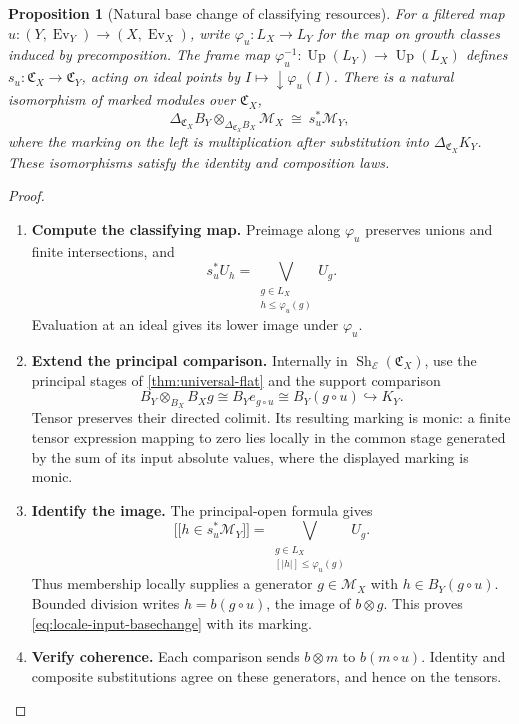 \documentclass[11pt,a4paper]{article}
\numberwithin{algorithm}{section}
\numberwithin{equation}{section}
\newtheorem{proposition}[proposition]{Proposition}
\theoremstyle{definition}
\theoremstyle{remark}
\theoremstyle{plain}
\newcommand{\E}{\mathcal E}
\newcommand{\incl}{\hookrightarrow}
\newcommand{\llbracket}{\mathopen{[\![}}
\newcommand{\rrbracket}{\mathclose{]\!]}}
\newcommand{\Ev}{{\operatorname{Ev}}}
\newcommand{\Up}{\operatorname{Up}}
\newcommand{\Sh}{\operatorname{Sh}}
\theoremstyle{definition}
\theoremstyle{plain}
\begin{document}
\begin{proposition}[Natural base change of classifying resources]
\label{prop:locale-input-change}
For a filtered map
$u:(Y,\Ev_Y)\to(X,\Ev_X)$, write
$\varphi_u:L_X\to L_Y$ for the map on growth classes induced by precomposition.
The frame map $\varphi_u^{-1}:\Up(L_Y)\to\Up(L_X)$ defines
$s_u:\mathfrak C_X\to\mathfrak C_Y$, acting on ideal points by
$I\mapsto\downarrow\varphi_u(I)$.  There is a natural
isomorphism of marked modules over $\mathfrak C_X$,
\begin{equation}\label{eq:locale-input-basechange}
 \Delta_{\mathfrak C_X}B_Y
 \otimes_{\Delta_{\mathfrak C_X}B_X}\mathscr M_X
 \ \cong\ s_u^*\mathscr M_Y,
\end{equation}
where the marking on the left is multiplication after
substitution into $\Delta_{\mathfrak C_X}K_Y$.
These isomorphisms satisfy the identity and composition laws.
\end{proposition}
\begin{proof}\leavevmode
\begin{enumerate}[leftmargin=*,align=left]
\item \textbf{Compute the classifying map.}
Preimage along $\varphi_u$ preserves unions and finite intersections,
and
\[
 s_u^*U_h=\bigvee_{\substack{g\in L_X\\h\le\varphi_u(g)}}U_g.
\]
Evaluation at an ideal gives its lower image under $\varphi_u$.

\item \textbf{Extend the principal comparison.}
Internally in $\Sh_\E(\mathfrak C_X)$, use the principal stages of
\cref{thm:universal-flat} and the support comparison
\[
 B_Y\otimes_{B_X}B_Xg\cong B_Ye_{g\circ u}
       \cong B_Y(g\circ u)\incl K_Y.
\]
Tensor preserves their directed colimit. Its resulting marking is
monic: a finite tensor expression mapping to zero lies locally in
the common stage generated by the sum of its input absolute values,
where the displayed marking is monic.

\item \textbf{Identify the image.}
The principal-open formula gives
\[
 \llbracket h\in s_u^*\mathscr M_Y\rrbracket
 =\bigvee_{\substack{g\in L_X\\{}[|h|]\le\varphi_u(g)}}U_g.
\]
Thus membership locally supplies a generator $g\in\mathscr M_X$
with $h\in B_Y(g\circ u)$. Bounded division writes
$h=b(g\circ u)$, the image of $b\otimes g$. This proves
\eqref{eq:locale-input-basechange} with its marking.

\item \textbf{Verify coherence.}
Each comparison sends $b\otimes m$ to $b(m\circ u)$.
Identity and composite substitutions agree on these generators,
and hence on the tensors.
\end{enumerate}
\end{proof}
\end{document}
